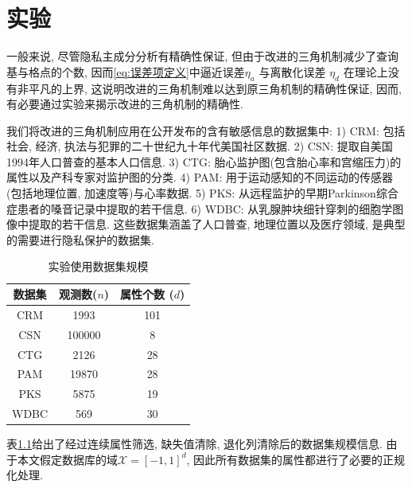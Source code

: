 \chapter{实验} %
\label{cha:实验}
一般来说, 尽管隐私主成分分析有精确性保证, 但由于改进的三角机制减少了查询基与格点的个数, 因而\eqref{eq:误差项定义}中逼近误差$\eta_a$ 与离散化误差 $\eta_d$ 在理论上没有非平凡的上界, 这说明改进的三角机制难以达到原三角机制的精确性保证, 因而, 有必要通过实验来揭示改进的三角机制的精确性.

我们将改进的三角机制应用在公开发布的含有敏感信息的数据集中: 1) CRM\parencite{dataset:CRM}: 包括社会, 经济, 执法与犯罪的二十世纪九十年代美国社区数据. 2) CSN\parencite{dataset:CSN}: 提取自美国1994年人口普查的基本人口信息. 3) CTG\parencite{dataset:CTG}: 胎心监护图(包含胎心率和宫缩压力)的属性以及产科专家对监护图的分类. 4) PAM\parencite{dataset:PAM}: 用于运动感知的不同运动的传感器(包括地理位置, 加速度等)与心率数据. 5) PKS\parencite{dataset:PKS}: 从远程监护的早期Parkinson综合症患者的嗓音记录中提取的若干信息. 6)  WDBC\parencite{dataset:WDBC}: 从乳腺肿块细针穿刺的细胞学图像中提取的若干信息. 这些数据集涵盖了人口普查, 地理位置以及医疗领域, 是典型的需要进行隐私保护的数据集.
\renewcommand{\arraystretch}{1.5}
\begin{table}[hbtp]\centering
  \caption{实验使用数据集规模}\label{tab:数据集规模}
  \begin{tabular}{c|cc}
    \hline
    数据集 & 观测数($n$) & 属性个数 ($d$) \\
    \hline
    CRM & 1993 & 101 \\
    CSN & 100000 & 8 \\
    CTG & 2126 & 28 \\
    PAM & 19870 & 28 \\
    PKS & 5875 & 19 \\
    WDBC & 569 & 30 \\
    \hline
  \end{tabular}
\end{table}
\renewcommand{\arraystretch}{1}

表\ref{tab:数据集规模}给出了经过连续属性筛选, 缺失值清除, 退化列清除后的数据集规模信息. 由于本文假定数据库的域$\mathcal{X} = [-1, 1]^d$, 因此所有数据集的属性都进行了必要的正规化处理. 

